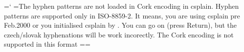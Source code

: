 %


\ifx\toneczech\undefined 
  {\newlinechar=`^^J
   \errhelp={The hyphen patterns are not loaded in Cork encoding in csplain.^^J
            Hyphen patterns are supported only in ISO-8859-2.^^J
            It means, you are using csplain pre Feb.2000 or^^J
            you initialised csplain by \let\Cork=\relax.^^J
            You can go on (press Return), but the czech/slovak^^J
            hyphenations will be work incorectly.}
  \errmessage
  {The Cork encoding is not supported in this format} %
  } 
\else
  \czech=\toneczech  \slovak=\toneslovak
\fi

